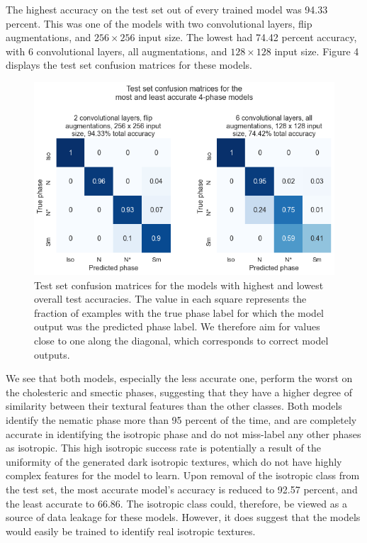 \documentclass[12pt]{article}
\begin{document}
The highest accuracy on the test set out of every trained model was 94.33 percent. This was one of the models with two convolutional layers, flip augmentations, and $256 \times 256$ input size. The lowest had 74.42 percent accuracy, with 6 convolutional layers, all augmentations, and $128 \times 128$ input size. Figure 4 displays the test set confusion matrices for these models.
\begin{figure}[!htb]
	\centering
    \includegraphics[width=6in]{images/confusion_matrix.png}
    \caption{Test set confusion matrices for the models with highest and lowest overall test accuracies. The value in each square represents the fraction of examples with the true phase label for which the model output was the predicted phase label. We therefore aim for values close to one along the diagonal, which corresponds to correct model outputs.}
\end{figure} 
We see that both models, especially the less accurate one, perform the worst on the cholesteric and smectic phases, suggesting that they have a higher degree of similarity between their textural features than the other classes. Both models identify the nematic phase more than 95 percent of the time, and are completely accurate in identifying the isotropic phase and do not miss-label any other phases as isotropic. This high isotropic  success rate is potentially a result of the uniformity of the generated dark isotropic textures, which do not have highly complex features for the model to learn. Upon removal of the isotropic class from the test set, the most accurate model's accuracy is reduced to 92.57 percent, and the least accurate to 66.86. The isotropic class could, therefore, be viewed as a source of data leakage for these models. However, it does suggest that the models would easily be trained to identify real isotropic textures. 
\end{document}
